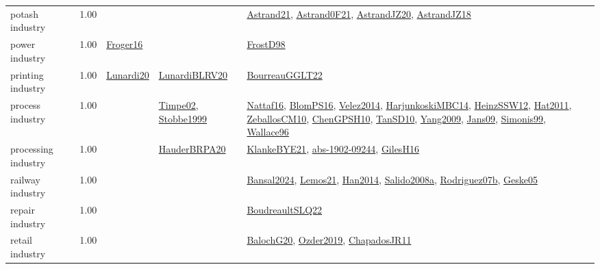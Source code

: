 {\begin{longtable}{p{3cm}r>{\raggedright\arraybackslash}p{6cm}>{\raggedright\arraybackslash}p{6cm}>{\raggedright\arraybackslash}p{8cm}}
\index{potash industry}\index{Industries!potash industry}potash industry &  1.00 &  &  & \hyperref[detail:Astrand21]{Astrand21}, \hyperref[detail:Astrand0F21]{Astrand0F21}, \hyperref[detail:AstrandJZ20]{AstrandJZ20}, \hyperref[detail:AstrandJZ18]{AstrandJZ18}\\
\index{power industry}\index{Industries!power industry}power industry &  1.00 & \hyperref[detail:Froger16]{Froger16} &  & \hyperref[detail:FrostD98]{FrostD98}\\
\index{printing industry}\index{Industries!printing industry}printing industry &  1.00 & \hyperref[detail:Lunardi20]{Lunardi20} & \hyperref[detail:LunardiBLRV20]{LunardiBLRV20} & \hyperref[detail:BourreauGGLT22]{BourreauGGLT22}\\
\index{process industry}\index{Industries!process industry}process industry &  1.00 &  & \hyperref[detail:Timpe02]{Timpe02}, \hyperref[detail:Stobbe1999]{Stobbe1999} & \hyperref[detail:Nattaf16]{Nattaf16}, \hyperref[detail:BlomPS16]{BlomPS16}, \hyperref[detail:Velez2014]{Velez2014}, \hyperref[detail:HarjunkoskiMBC14]{HarjunkoskiMBC14}, \hyperref[detail:HeinzSSW12]{HeinzSSW12}, \hyperref[detail:Hat2011]{Hat2011}, \hyperref[detail:ZeballosCM10]{ZeballosCM10}, \hyperref[detail:ChenGPSH10]{ChenGPSH10}, \hyperref[detail:TanSD10]{TanSD10}, \hyperref[detail:Yang2009]{Yang2009}, \hyperref[detail:Jans09]{Jans09}, \hyperref[detail:Simonis99]{Simonis99}, \hyperref[detail:Wallace96]{Wallace96}\\
\index{processing industry}\index{Industries!processing industry}processing industry &  1.00 &  & \hyperref[detail:HauderBRPA20]{HauderBRPA20} & \hyperref[detail:KlankeBYE21]{KlankeBYE21}, \hyperref[detail:abs-1902-09244]{abs-1902-09244}, \hyperref[detail:GilesH16]{GilesH16}\\
\index{railway industry}\index{Industries!railway industry}railway industry &  1.00 &  &  & \hyperref[detail:Bansal2024]{Bansal2024}, \hyperref[detail:Lemos21]{Lemos21}, \hyperref[detail:Han2014]{Han2014}, \hyperref[detail:Salido2008a]{Salido2008a}, \hyperref[detail:Rodriguez07b]{Rodriguez07b}, \hyperref[detail:Geske05]{Geske05}\\
\index{repair industry}\index{Industries!repair industry}repair industry &  1.00 &  &  & \hyperref[detail:BoudreaultSLQ22]{BoudreaultSLQ22}\\
\index{retail industry}\index{Industries!retail industry}retail industry &  1.00 &  &  & \hyperref[detail:BalochG20]{BalochG20}, \hyperref[detail:Ozder2019]{Ozder2019}, \hyperref[detail:ChapadosJR11]{ChapadosJR11}\\

\end{longtable}}
